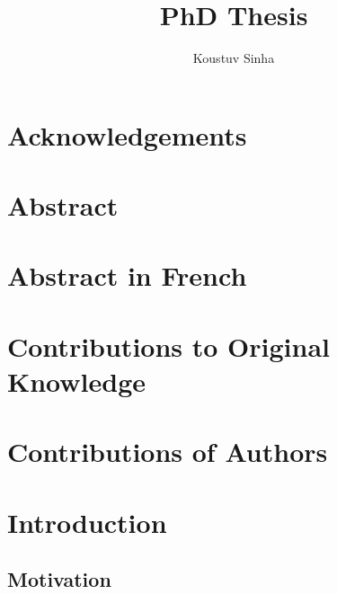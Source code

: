 \documentclass[letterpaper, 12pt]{report}
\author{Koustuv Sinha}
\date{}
\title{PhD Thesis}
\begin{document}
\maketitle
\raggedbottom
{}%
{}

\chapter*{Acknowledgements}
\label{sec:org111920c}
\chapter*{Abstract}
\label{sec:orgec62e8c}
\chapter*{Abstract in French}
\label{sec:org71795cd}
\chapter*{Contributions to Original Knowledge}
\label{sec:org3bc5b8a}
\chapter*{Contributions of Authors}
\label{sec:org2435b5a}

\listoffigures{}

\listoftables{}

\clearpage
\setcounter{tocdepth}{3}
\tableofcontents

\clearpage


\chapter{Introduction}
\label{sec:orgeb32902}


\section{Motivation}
\end{document}
